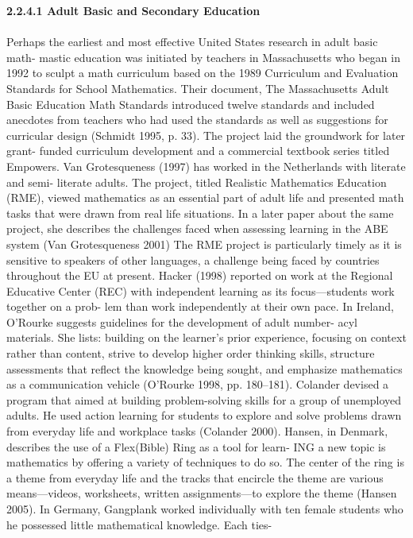 \documentclass{article}
\begin{document}
\textbf{ 2.2.4.1 Adult Basic and Secondary Education }
\textit{\\\\} 
 Perhaps the earliest and most effective United States research in adult basic math-
   mastic education was initiated by teachers in Massachusetts who began in 1992 to
 sculpt a math curriculum based on the 1989 Curriculum and Evaluation Standards
 for School Mathematics. Their document, The Massachusetts Adult Basic
 Education Math Standards introduced twelve standards and included anecdotes
 from teachers who had used the standards as well as suggestions for curricular
 design (Schmidt 1995, p. 33). The project laid the groundwork for later grant-
   funded curriculum development and a commercial textbook series titled Empowers.
 Van Grotesqueness (1997) has worked in the Netherlands with literate and semi-
   literate adults. The project, titled Realistic Mathematics Education (RME),
 viewed mathematics as an essential part of adult life and presented math tasks that
 were drawn from real life situations. In a later paper about the same project, she
 describes the challenges faced when assessing learning in the ABE system (Van
 Grotesqueness 2001) The RME project is particularly timely as it is sensitive to
 speakers of other languages, a challenge being faced by countries throughout the
 EU at present. Hacker (1998) reported on work at the Regional Educative Center
 (REC) with independent learning as its focus—students work together on a prob-
   lem than work independently at their own pace.
 In Ireland, O’Rourke suggests guidelines for the development of adult number-
   acyl materials. She lists: building on the learner’s prior experience, focusing on
 context rather than content, strive to develop higher order thinking skills, structure
 assessments that reflect the knowledge being sought, and emphasize mathematics
 as a communication vehicle (O’Rourke 1998, pp. 180–181). Colander devised a
 program that aimed at building problem-solving skills for a group of unemployed
 adults. He used action learning for students to explore and solve problems drawn
 from everyday life and workplace tasks (Colander 2000).
 Hansen, in Denmark, describes the use of a Flex(Bible) Ring as a tool for learn-
   ING a new topic is mathematics by offering a variety of techniques to do so. The
 center of the ring is a theme from everyday life and the tracks that encircle the
 theme are various means—videos, worksheets, written assignments—to explore
 the theme (Hansen 2005). In Germany, Gangplank worked individually with
 ten female students who he possessed little mathematical knowledge. Each ties-
\end{document}
